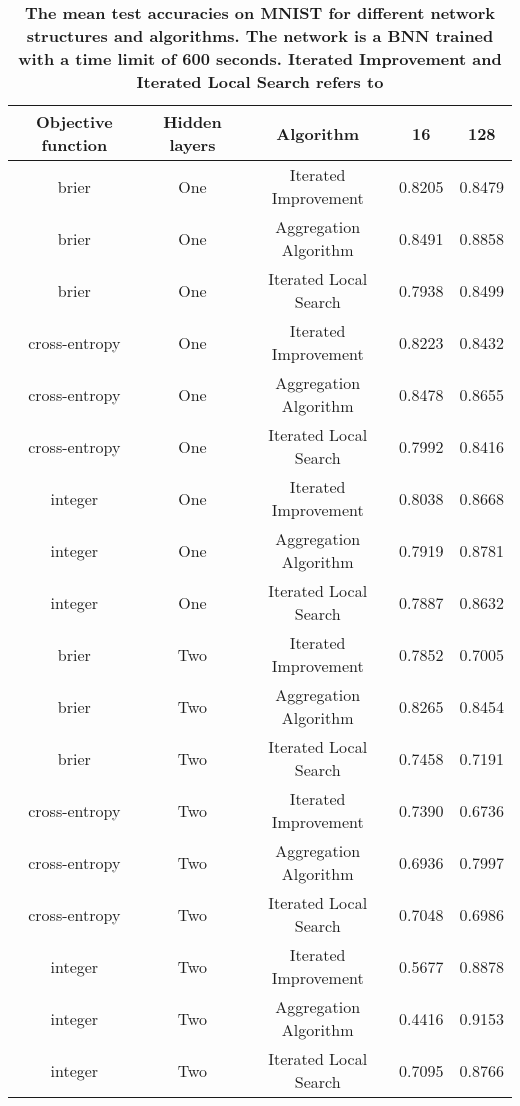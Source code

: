 \begin{center}
\begin{table}[H]
\centering
\begin{tabular}{|c|c|c|c|c|}
  \hline
Objective function & Hidden layers & Algorithm & 16 & 128 \\ 
  \hline
brier & One & Iterated Improvement & 0.8205 & 0.8479 \\ 
   \hline
brier & One & Aggregation Algorithm & 0.8491 & 0.8858 \\ 
   \hline
brier & One & Iterated Local Search & 0.7938 & 0.8499 \\ 
   \hline
cross-entropy & One & Iterated Improvement & 0.8223 & 0.8432 \\ 
   \hline
cross-entropy & One & Aggregation Algorithm & 0.8478 & 0.8655 \\ 
   \hline
cross-entropy & One & Iterated Local Search & 0.7992 & 0.8416 \\ 
   \hline
integer & One & Iterated Improvement & 0.8038 & 0.8668 \\ 
   \hline
integer & One & Aggregation Algorithm & 0.7919 & 0.8781 \\ 
   \hline
integer & One & Iterated Local Search & 0.7887 & 0.8632 \\ 
   \hline
brier & Two & Iterated Improvement & 0.7852 & 0.7005 \\ 
   \hline
brier & Two & Aggregation Algorithm & 0.8265 & 0.8454 \\ 
   \hline
brier & Two & Iterated Local Search & 0.7458 & 0.7191 \\ 
   \hline
cross-entropy & Two & Iterated Improvement & 0.7390 & 0.6736 \\ 
   \hline
cross-entropy & Two & Aggregation Algorithm & 0.6936 & 0.7997 \\ 
   \hline
cross-entropy & Two & Iterated Local Search & 0.7048 & 0.6986 \\ 
   \hline
integer & Two & Iterated Improvement & 0.5677 & 0.8878 \\ 
   \hline
integer & Two & Aggregation Algorithm & 0.4416 & 0.9153 \\ 
   \hline
integer & Two & Iterated Local Search & 0.7095 & 0.8766 \\ 
   \hline
\end{tabular}
\caption{\small{\textbf{The mean test accuracies on MNIST for different network structures and algorithms. The network is a
            BNN trained with a time limit of 600 seconds. Iterated Improvement and Iterated Local Search refers to
}}}
\end{table}
\end{center}
